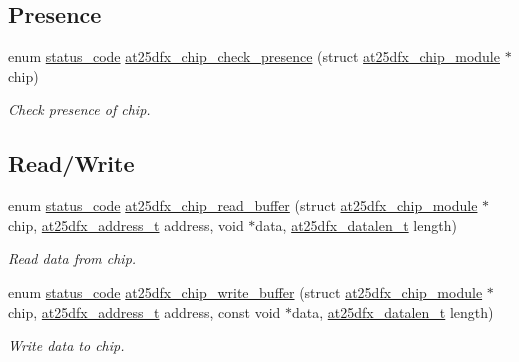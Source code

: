 \subsection*{Presence}
\begin{DoxyCompactItemize}
\item 
enum \mbox{\hyperlink{group__group__sam0__utils__status__codes_ga751c892e5a46b8e7d282085a5a5bf151}{status\+\_\+code}} \mbox{\hyperlink{group__asfdoc__common2__at25dfx__group_gabc77a5e6b7714d6a3731505b24ac5082}{at25dfx\+\_\+chip\+\_\+check\+\_\+presence}} (struct \mbox{\hyperlink{structat25dfx__chip__module}{at25dfx\+\_\+chip\+\_\+module}} $\ast$chip)
\begin{DoxyCompactList}\small\item\em Check presence of chip. \end{DoxyCompactList}\end{DoxyCompactItemize}
\subsection*{Read/\+Write}
\begin{DoxyCompactItemize}
\item 
enum \mbox{\hyperlink{group__group__sam0__utils__status__codes_ga751c892e5a46b8e7d282085a5a5bf151}{status\+\_\+code}} \mbox{\hyperlink{group__asfdoc__common2__at25dfx__group_ga867ff68dbb3def1fbac0c9359ea7e36e}{at25dfx\+\_\+chip\+\_\+read\+\_\+buffer}} (struct \mbox{\hyperlink{structat25dfx__chip__module}{at25dfx\+\_\+chip\+\_\+module}} $\ast$chip, \mbox{\hyperlink{group__asfdoc__common2__at25dfx__group_ga6797a814b041014cef23de480c9da9ef}{at25dfx\+\_\+address\+\_\+t}} address, void $\ast$data, \mbox{\hyperlink{group__asfdoc__common2__at25dfx__group_gaebf176d512c4cc61390aef7159ddccb9}{at25dfx\+\_\+datalen\+\_\+t}} length)
\begin{DoxyCompactList}\small\item\em Read data from chip. \end{DoxyCompactList}\item 
enum \mbox{\hyperlink{group__group__sam0__utils__status__codes_ga751c892e5a46b8e7d282085a5a5bf151}{status\+\_\+code}} \mbox{\hyperlink{group__asfdoc__common2__at25dfx__group_ga680dae17472f869582c92512d4995dcc}{at25dfx\+\_\+chip\+\_\+write\+\_\+buffer}} (struct \mbox{\hyperlink{structat25dfx__chip__module}{at25dfx\+\_\+chip\+\_\+module}} $\ast$chip, \mbox{\hyperlink{group__asfdoc__common2__at25dfx__group_ga6797a814b041014cef23de480c9da9ef}{at25dfx\+\_\+address\+\_\+t}} address, const void $\ast$data, \mbox{\hyperlink{group__asfdoc__common2__at25dfx__group_gaebf176d512c4cc61390aef7159ddccb9}{at25dfx\+\_\+datalen\+\_\+t}} length)
\begin{DoxyCompactList}\small\item\em Write data to chip. \end{DoxyCompactList}\end{DoxyCompactItemize}
